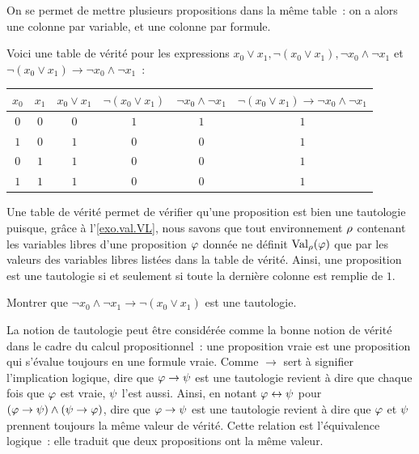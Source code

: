 \begin{remark}
  On se permet de mettre plusieurs propositions dans la même table~: on a alors
  une colonne par variable, et une colonne par formule.
\end{remark}

\begin{example}
  Voici une table de vérité pour les expressions
  $x_0\lor x_1, \lnot (x_0\lor x_1), \lnot x_0\land \lnot x_1$ et
  $\lnot (x_0 \lor x_1)\to \lnot x_0 \land \lnot x_1$~:
  \begin{center}
    \begin{tabular}{|c|c|c|c|c|c|}
      \hline $x_0$ & $x_1$ & $x_0\lor x_1$ & $\lnot (x_0\lor x_1)$ &
      $\lnot x_0 \land \lnot x_1$ &
      $\lnot (x_0 \lor x_1)\to \lnot x_0 \land \lnot x_1$\\
      \hline $0$ & $0$ & $0$ & $1$ & $1$ & $1$ \\
      \hline $1$ & $0$ & $1$ & $0$ & $0$ & $1$ \\
      \hline $0$ & $1$ & $1$ & $0$ & $0$ & $1$ \\
      \hline $1$ & $1$ & $1$ & $0$ & $0$ & $1$ \\
      \hline
    \end{tabular}
  \end{center}
\end{example}

Une table de vérité permet de vérifier qu'une proposition est bien une
tautologie puisque, grâce à l'\cref{exo.val.VL}, nous savons que tout
environnement $\rho$ contenant les variables libres d'une proposition $\varphi$
donnée
ne définit $\operatorname{Val}_{\rho}(\varphi)$ que par les valeurs des variables libres
listées dans
la table de vérité. Ainsi, une proposition est une tautologie si et seulement si
toute la dernière colonne est remplie de $1$.

\begin{exercise}
  Montrer que $\lnot x_0\land \lnot x_1 \to \lnot (x_0\lor x_1)$ est une
  tautologie.
\end{exercise}

La notion de tautologie peut être considérée comme la bonne notion de vérité
dans le cadre du calcul propositionnel~: une proposition vraie est une
proposition qui s'évalue toujours en une formule vraie. Comme $\to$ sert à
signifier l'implication logique, dire que $\varphi \to \psi$ est une
tautologie revient à
dire que chaque fois que $\varphi$ est vraie, $\psi$ l'est aussi. Ainsi, en
notant
$\varphi \mathrel{\leftrightarrow} \psi$ pour
$(\varphi \to \psi) \land (\psi \to \varphi)$, dire que
$\varphi \to \psi$ est une tautologie revient à dire que
$\varphi$ et $\psi$ prennent
toujours la même valeur de vérité. Cette relation est l'équivalence logique~:
elle traduit que deux propositions ont la même valeur.

